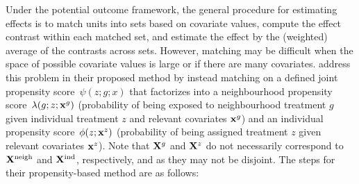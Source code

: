 \documentclass[10pt]{article}
\begin{document}
Under the potential outcome framework, the general procedure for estimating effects is to match units into sets based on covariate values, compute the effect contrast within each matched set, and estimate the effect by the (weighted) average of the contrasts across sets. However, matching may be difficult when the space of possible covariate values is large or if there are many covariates. \textcite{Forastiere:2021} address this problem in their proposed method by instead matching on a defined joint propensity score~$\psi(z;g;x)$ that factorizes into a neighbourhood propensity score~$\lambda(g;z;\mathbf{x}^g)$ (probability of being exposed to neighbourhood treatment $g$ given individual treatment $z$ and relevant covariates $\mathbf{x}^g$) and an individual propensity score~$\phi(z;\mathbf{x}^z)$ (probability of being assigned treatment $z$ given relevant covariates $\mathbf{x}^z$). Note that $\mathbf{X}^g$ and $\mathbf{X}^z$ do not necessarily correspond to $\mathbf{X}^{\text{neigh}}$ and $\mathbf{X}^{\text{ind}}$, respectively, and as they may not be disjoint. The steps for their propensity-based method are as follows:
\end{document}
